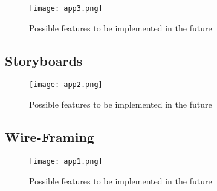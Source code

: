 \documentclass[fontsize=11pt]{extarticle}
\numberwithin{figure}{section} %
\begin{document}
\begin{landscape}
 \begin{figure}[H]
      \centering
      \texttt{[image: app3.png]}
      \caption{Possible features to be implemented in the future}
 \end{figure}
  \end{landscape}

\newpage

\begin{landscape}
\subsection{Storyboards}
 \begin{figure}[H]
      \centering
      \texttt{[image: app2.png]}
      \caption{Possible features to be implemented in the future}
 \end{figure}
\end{landscape}

 \newpage

\begin{landscape}
\subsection{Wire-Framing}
\begin{figure}[H]
      \centering
      \texttt{[image: app1.png]}
      \caption{Possible features to be implemented in the future}
 \end{figure}
 \end{landscape}
\end{document}

